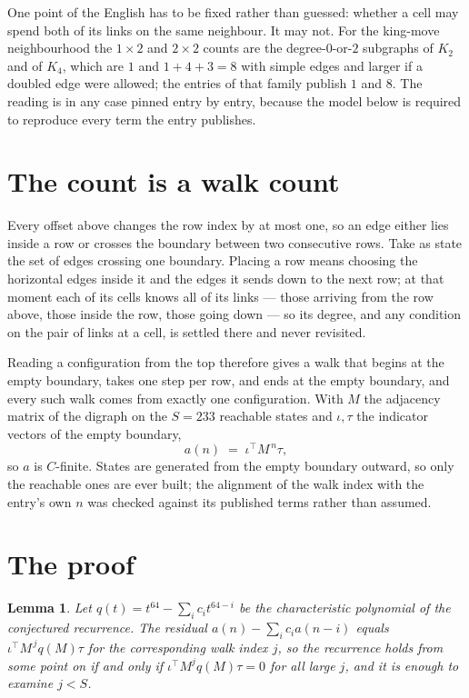 \documentclass[11pt,a4paper]{article}
\theoremstyle{plain}
\newtheorem{lemma}[theorem]{Lemma}
\theoremstyle{definition}
\begin{document}
One point of the English has to be fixed rather than guessed: whether a cell may spend both of
its links on the same neighbour. It may not. For the king-move neighbourhood the $1\times2$
and $2\times2$ counts are the degree-$0$-or-$2$ subgraphs of $K_2$ and of $K_4$, which are $1$
and $1+4+3=8$ with simple edges and larger if a doubled edge were allowed; the entries of that
family publish $1$ and $8$. The reading is in any case pinned entry by entry, because the
model below is required to reproduce every term the entry publishes.


\section{The count is a walk count}

Every offset above changes the row index by at most one, so an edge either lies inside a row
or crosses the boundary between two consecutive rows. Take as state the set of edges crossing
one boundary. Placing a row means choosing the horizontal edges inside it and the edges it
sends down to the next row; at that moment each of its cells knows all of its links --- those
arriving from the row above, those inside the row, those going down --- so its degree, and any
condition on the pair of links at a cell, is settled there and never revisited.

Reading a configuration from the top therefore gives a walk that begins at the empty boundary,
takes one step per row, and ends at the empty boundary, and every such walk comes from exactly
one configuration. With $M$ the adjacency matrix of the digraph on the $S=233$ reachable
states and $\iota,\tau$ the indicator vectors of the empty boundary,
\[
a(n)\;=\;\iota^{\!\top}M^{\,n}\tau ,
\]
so $a$ is $C$-finite. States are generated from the empty boundary outward, so only the
reachable ones are ever built; the alignment of the walk index with the entry's own $n$ was
checked against its published terms rather than assumed.

\section{The proof}

\begin{lemma}\label{lem:crit}
Let $q(t)=t^{64}-\sum_i c_it^{64-i}$ be the characteristic polynomial of the
conjectured recurrence. The residual $a(n)-\sum_ic_ia(n-i)$ equals
$\iota^{\!\top}M^{\,j}q(M)\tau$ for the corresponding walk index $j$, so the recurrence
holds from some point on if and only if $\iota^{\!\top}M^{j}q(M)\tau=0$ for all large $j$,
and it is enough to examine $j<S$.
\end{lemma}
\end{document}
